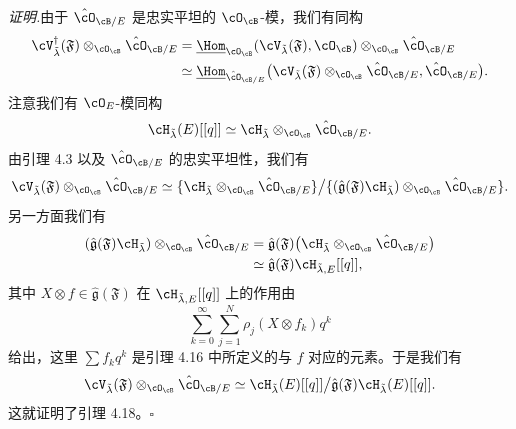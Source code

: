 \noindent\textit{证明.}\quad 由于 $\hat\cO_{\cB/E}$ 是忠实平坦的 $\cO_\cB$-模，我们有同构
\begin{align*}
 \cV^\dagger_{\tilde\lambda}(\mathfrak F)\otimes_{\cO_\cB}\hat\cO_{\cB/E}
 &=\underline{\Hom}_{\cO_\cB}(\cV_{\tilde\lambda}(\mathfrak F),\cO_\cB)\otimes_{\cO_\cB}\hat\cO_{\cB/E}\\
 &\simeq\underline{\Hom}_{\hat\cO_{\cB/E}}\big(\cV_{\tilde\lambda}(\mathfrak F)\otimes_{\cO_\cB}\hat\cO_{\cB/E},\hat\cO_{\cB/E}\big).
\end{align*}
注意我们有 $\cO_E$-模同构
\[
 \cH_{\tilde\lambda}(E)[[q]]\simeq\cH_{\tilde\lambda}\otimes_{\cO_\cB}\hat\cO_{\cB/E}.
\]
由引理 4.3 以及 $\hat\cO_{\cB/E}$ 的忠实平坦性，我们有
\[
 \cV_{\tilde\lambda}(\mathfrak F)\otimes_{\cO_\cB}\hat\cO_{\cB/E}
 \simeq\{\cH_{\tilde\lambda}\otimes_{\cO_\cB}\hat\cO_{\cB/E}\}
 \big/\{(\hat{\mathfrak g}(\mathfrak F)\cH_{\tilde\lambda})\otimes_{\cO_\cB}\hat\cO_{\cB/E}\}.
\]
另一方面我们有
\begin{align*}
 (\hat{\mathfrak g}(\mathfrak F)\cH_{\tilde\lambda})\otimes_{\cO_\cB}\hat\cO_{\cB/E}
 &=\hat{\mathfrak g}(\mathfrak F)\big(\cH_{\tilde\lambda}\otimes_{\cO_\cB}\hat\cO_{\cB/E}\big)\\
 &\simeq\hat{\mathfrak g}(\mathfrak F)\cH_{\tilde\lambda,E}[[q]],
\end{align*}
其中 $X\otimes f\in\hat{\mathfrak g}(\mathfrak F)$ 在 $\cH_{\tilde\lambda,E}[[q]]$ 上的作用由
\[
 \sum_{k=0}^{\infty}\sum_{j=1}^{N}\rho_j(X\otimes f_k)q^k
\]
给出，这里 $\sum f_kq^k$ 是引理 4.16 中所定义的与 $f$ 对应的元素。于是我们有
\[
 \cV_{\tilde\lambda}(\mathfrak F)\otimes_{\cO_\cB}\hat\cO_{\cB/E}
 \simeq\cH_{\tilde\lambda}(E)[[q]]\big/\hat{\mathfrak g}(\mathfrak F)\cH_{\tilde\lambda}(E)[[q]].
\]
这就证明了引理 4.18。\hfill$\square$




